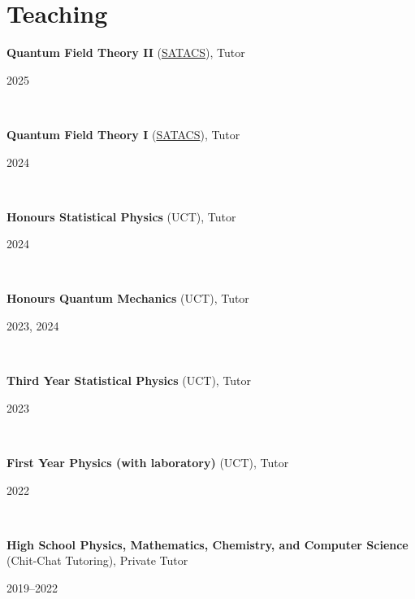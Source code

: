 \documentclass[11pt,letter,sans]{moderncv}
\begin{document}
\section{Teaching}
\begin{minipage}[t]{0.8\textwidth}
	\textbf{Quantum Field Theory II} (\href{https://nithecs.ac.za/south-african-theory-and-computational-school/}{SATACS}), Tutor
\end{minipage}\hfill
\begin{minipage}[t]{0.2\textwidth}
  \hfill 2025 
\end{minipage}\\
\begin{minipage}[t]{0.8\textwidth}
	\textbf{Quantum Field Theory I} (\href{https://nithecs.ac.za/south-african-theory-and-computational-school/}{SATACS}), Tutor
\end{minipage}\hfill
\begin{minipage}[t]{0.2\textwidth}
  \hfill 2024 
\end{minipage}\\
\begin{minipage}[t]{0.8\textwidth}
	\textbf{Honours Statistical Physics} (UCT), Tutor
\end{minipage}\hfill
\begin{minipage}[t]{0.2\textwidth}
  \hfill 2024 
\end{minipage}\\
\begin{minipage}[t]{0.8\textwidth}
	\textbf{Honours Quantum Mechanics} (UCT), Tutor
\end{minipage}\hfill
\begin{minipage}[t]{0.2\textwidth}
  \hfill 2023, 2024 
\end{minipage}\\
\begin{minipage}[t]{0.8\textwidth}
	\textbf{Third Year Statistical Physics} (UCT), Tutor
\end{minipage}\hfill
\begin{minipage}[t]{0.2\textwidth}
  \hfill 2023 
\end{minipage}\\
\begin{minipage}[t]{0.8\textwidth}
	\textbf{First Year Physics (with laboratory)} (UCT), Tutor
\end{minipage}\hfill
\begin{minipage}[t]{0.2\textwidth}
  \hfill 2022 
\end{minipage}\\
\begin{minipage}[t]{0.8\textwidth}
	\textbf{High School Physics, Mathematics, Chemistry, and Computer Science} (Chit-Chat Tutoring), Private Tutor
\end{minipage}\hfill
\begin{minipage}[t]{0.2\textwidth}
  \hfill 2019--2022 
\end{minipage}\\
\end{document}
